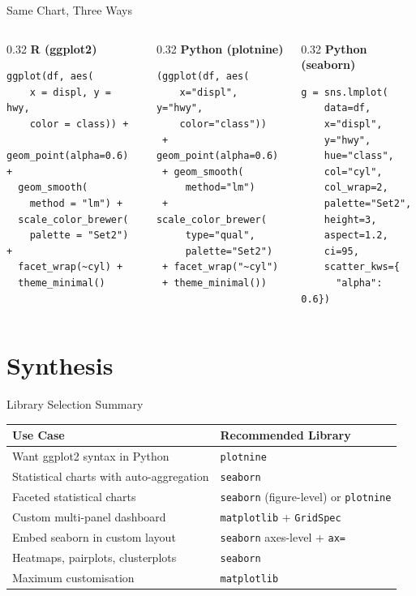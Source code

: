 \documentclass[10pt]{beamer}
\begin{document}
\begin{frame}[fragile]{Same Chart, Three Ways}
  \begin{columns}[T]
    \begin{column}{0.32\textwidth}
      \textbf{R (ggplot2)}
\begin{lstlisting}[style=rstyle]
ggplot(df, aes(
    x = displ, y = hwy,
    color = class)) +
  geom_point(alpha=0.6) +
  geom_smooth(
    method = "lm") +
  scale_color_brewer(
    palette = "Set2") +
  facet_wrap(~cyl) +
  theme_minimal()
\end{lstlisting}
    \end{column}
    \begin{column}{0.32\textwidth}
      \textbf{Python (plotnine)}
\begin{lstlisting}[style=pythonstyle]
(ggplot(df, aes(
    x="displ", y="hwy",
    color="class"))
 + geom_point(alpha=0.6)
 + geom_smooth(
     method="lm")
 + scale_color_brewer(
     type="qual",
     palette="Set2")
 + facet_wrap("~cyl")
 + theme_minimal())
\end{lstlisting}
    \end{column}
    \begin{column}{0.32\textwidth}
      \textbf{Python (seaborn)}
\begin{lstlisting}[style=pythonstyle]
g = sns.lmplot(
    data=df,
    x="displ",
    y="hwy",
    hue="class",
    col="cyl",
    col_wrap=2,
    palette="Set2",
    height=3,
    aspect=1.2,
    ci=95,
    scatter_kws={
      "alpha": 0.6})
\end{lstlisting}
    \end{column}
  \end{columns}
\end{frame}

\section{Synthesis}

\begin{frame}{Library Selection Summary}
  \centering
  \begin{tabular}{lp{6cm}}
    \toprule
    \textbf{Use Case} & \textbf{Recommended Library} \\
    \midrule
    Want ggplot2 syntax in Python & \texttt{plotnine} \\
    Statistical charts with auto-aggregation & \texttt{seaborn} \\
    Faceted statistical charts & \texttt{seaborn} (figure-level) or \texttt{plotnine} \\
    Custom multi-panel dashboard & \texttt{matplotlib} + \texttt{GridSpec} \\
    Embed seaborn in custom layout & \texttt{seaborn} axes-level + \texttt{ax=} \\
    Heatmaps, pairplots, clusterplots & \texttt{seaborn} \\
    Maximum customisation & \texttt{matplotlib} \\
    \bottomrule
  \end{tabular}
\end{frame}
\end{document}
